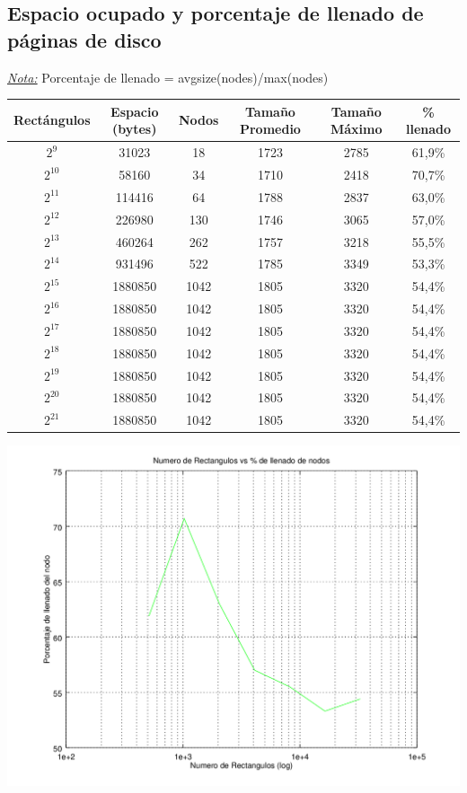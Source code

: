 \documentclass[letterpaper,10pt]{article}
\begin{document}
	\subsection{Espacio ocupado y porcentaje de llenado de páginas de disco}

	\underline{\textit{Nota:}} Porcentaje de llenado = avgsize(nodes)/max(nodes)

	\begin{center}

		\begin{tabular}{|c|c|c|c|c|c|}
			\hline
			Rectángulos	& Espacio (bytes) & Nodos & Tamaño Promedio & Tamaño Máximo & \% llenado\\
			\hline
			$2^{9}$ 	& 31023 & 18 & 1723 & 2785 & 61,9\%\\
			\hline
			$2^{10}$ 	& 58160 & 34 & 1710 & 2418 & 70,7\%\\
			\hline
			$2^{11}$ 	& 114416 & 64 & 1788 & 2837 & 63,0\%\\
			\hline
			$2^{12}$ 	& 226980 & 130 & 1746 & 3065 & 57,0\%\\
			\hline
			$2^{13}$ 	& 460264 & 262 & 1757 & 3218 & 55,5\%\\
			\hline
			$2^{14}$ 	& 931496 & 522 & 1785 & 3349 & 53,3\%\\
			\hline
			$2^{15}$ 	& 1880850 & 1042 & 1805 & 3320 & 54,4\%\\
			\hline
			$2^{16}$ 	& 1880850 & 1042 & 1805 & 3320 & 54,4\%\\
			\hline
			$2^{17}$ 	& 1880850 & 1042 & 1805 & 3320 & 54,4\%\\
			\hline
			$2^{18}$ 	& 1880850 & 1042 & 1805 & 3320 & 54,4\%\\
			\hline
			$2^{19}$ 	& 1880850 & 1042 & 1805 & 3320 & 54,4\%\\
			\hline
			$2^{20}$ 	& 1880850 & 1042 & 1805 & 3320 & 54,4\%\\
			\hline
			$2^{21}$ 	& 1880850 & 1042 & 1805 & 3320 & 54,4\%\\
			\hline
		\end{tabular}

		\includegraphics[width=0.75\textheight]{fig2.png}
	\end{center}
\end{document}
